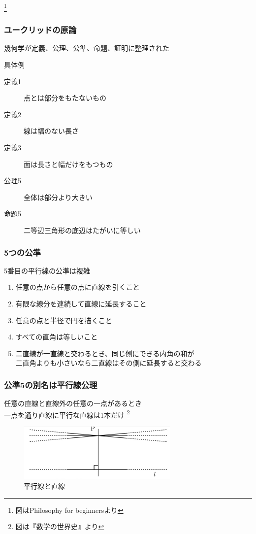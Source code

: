 \documentclass[unicode, 14pt, aspectratio=169]{beamer}
\newcommand\blfootnote[1]{%
  \begingroup
  \renewcommand\thefootnote{}\footnote{#1}%
  \addtocounter{footnote}{-1}%
  \endgroup
}
\begin{document}
\begin{frame}
\begin{columns}
\begin{column}{0.25\textwidth}
\begin{center}
    \end{center}
  \end{column}  
\end{columns}
\blfootnote{図はPhilosophy for beginners\supercite{philosophy-for-begginers}より} 
\end{frame}
\begin{frame}
  \frametitle{ユークリッドの原論}
  {\large 幾何学が定義、公理、公準、命題、証明に整理された}
  \par
  \vspace{16pt}
  具体例
  \begin{description}
  \item[定義1] 点とは部分をもたないもの
  \item[定義2] 線は幅のない長さ
  \item[定義3] 面は長さと幅だけをもつもの
  \item[公理5] 全体は部分より大きい
  \item[命題5] 二等辺三角形の底辺はたがいに等しい
  \end{description}
\end{frame}
\begin{frame}
  \frametitle{5つの公準}
  {\large 5番目の平行線の公準は複雑}
  \par
  \vspace{16pt}  
  \begin{enumerate}
  \item 任意の点から任意の点に直線を引くこと
  \item 有限な線分を連続して直線に延長すること
  \item 任意の点と半径で円を描くこと
  \item すべての直角は等しいこと
  \item 二直線が一直線と交わるとき、同じ側にできる内角の和が\\二直角よりも小さいなら二直線はその側に延長すると交わる
  \end{enumerate}
\end{frame}
\begin{frame}[t]
  \frametitle{公準5の別名は平行線公理}
  {\large 任意の直線と直線外の任意の一点があるとき\\一点を通り直線に平行な直線は1本だけ}
  \blfootnote{図は『数学の世界史』\supercite{suugaku-no-sekaishi}より}
  \begin{figure}
    \includegraphics[width=0.7\textwidth]{images/axiom5.png}
    \caption{平行線と直線}
  \end{figure}
\end{frame}
\end{document}
